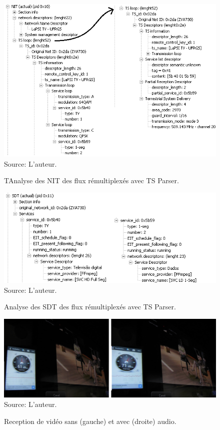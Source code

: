 \documentclass[12pt,a4paper]{article}
\begin{document}
\begin{figure}[!h]
\centering
\caption{TAnalyse des NIT des flux rémultiplexés avec TS Parser.}
\includegraphics[width=0.9\linewidth]{pictures/ts_parser_tve_remux_nit.png}
\\Source: L'auteur.
\label{fig:ts_parser_tve_remux_nit}
\end{figure}

\begin{figure}[!h]
\centering
\caption{Analyse des SDT des flux rémultiplexés avec TS Parser.}
\includegraphics[width=0.9\linewidth]{pictures/ts_parser_tve_remux_sdt.png}
\\Source: L'auteur.
\label{fig:ts_parser_tve_remux_sdt}
\end{figure}

\begin{figure}[!h]
\centering
\caption{Reception de vidéo sans (gauche) et avec (droite) audio.}
\includegraphics[width=0.9\linewidth]{pictures/video_audio_both.jpg}
\\Source: L'auteur.
\label{fig:video_audio_both}
\end{figure}
\end{document}
